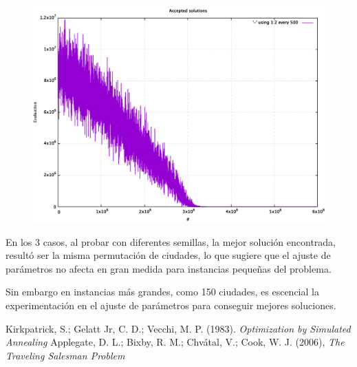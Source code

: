\documentclass[12pt, letterpaper]{article}
\begin{document}
\begin{figure}[H]
    \centering
    \includegraphics[width=\linewidth]{3.png}
    \label{fig:3}
\end{figure}

En los 3 casos, al probar con diferentes semillas, la mejor solución encontrada, resultó ser la misma permutación de ciudades, lo que sugiere que el ajuste de parámetros no afecta en gran medida para instancias pequeñas del problema.
\par
Sin embargo en instancias más grandes, como 150 ciudades, es escencial la experimentación en el ajuste de parámetros para conseguir mejores soluciones.

\begin{thebibliography}{2}
Kirkpatrick, S.; Gelatt Jr, C. D.; Vecchi, M. P. (1983). \textit{Optimization by Simulated Annealing}
Applegate, D. L.; Bixby, R. M.; Chvátal, V.; Cook, W. J. (2006), \textit{The Traveling Salesman Problem}
\end{thebibliography}
\end{document}
